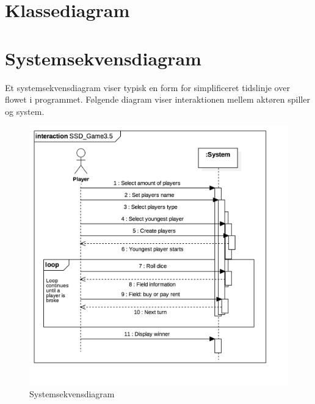 \section{Klassediagram}

\pagebreak

\section{Systemsekvensdiagram}
Et systemsekvensdiagram viser typisk en form for simplificeret tidslinje over flowet i programmet. Følgende diagram viser interaktionen mellem aktøren spiller og system.

\begin{figure}[H]
    \begin{center}
        \includegraphics[width=\columnwidth]{graphics/domain/SSD_Game3nw.png}
        \caption{Systemsekvensdiagram}
        \label{fig:systemsekvens_diagram}
    \end{center}
\end{figure}

